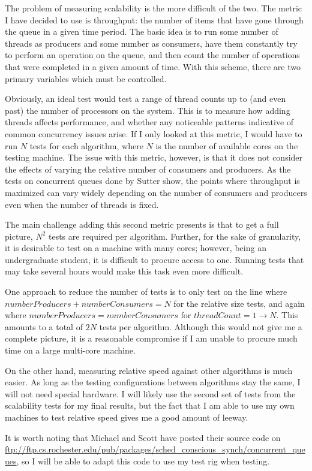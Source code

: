 \documentclass[12pt]{report}
\begin{document}
The problem of measuring scalability is the more difficult of the two. The
metric I have decided to use is throughput: the number of items that have gone
through the queue in a given time period. The basic idea is to run some number
of threads as producers and some number as consumers, have them constantly try
to perform an operation on the queue, and then count the number of operations
that were completed in a given amount of time. With this scheme,
there are two primary variables which must be controlled.

Obviously, an ideal test would test a range of thread counts up to (and even
past) the number of processors on the system. This is to measure how adding
threads affects performance, and whether any noticeable patterns indicative of
common concurrency issues arise. If I only looked at this metric, I would have
to run $N$ tests for each algorithm, where $N$ is the number of available cores
on the testing machine. The issue with this metric, however, is that it does
not consider the effects of varying the relative number of consumers and
producers. As the tests on concurrent queues done by Sutter\cite{suttertest} show,
the points where throughput is maximized can vary widely depending on the
number of consumers and producers even when the number of threads is fixed.

The main challenge adding this second metric presents is that to get a full
picture, $N^2$ tests are required per algorithm. Further, for the sake of
granularity, it is desirable to test on a machine with many cores; however,
being an undergraduate student, it is difficult to procure access to one.
Running tests that may take several hours would make this task even more
difficult.

One approach to reduce the number of tests is to only test on the line where
$numberProducers+numberConsumers=N$ for the relative size tests, and again
where $numberProducers=numberConsumers$ for $threadCount=1\to N$. This amounts
to a total of $2N$ tests per algorithm. Although this would not give me a
complete picture, it is a reasonable compromise if I am unable to procure much
time on a large multi-core machine.

On the other hand, measuring relative speed against other algorithms is much
easier. As long as the testing configurations between algorithms stay the same,
I will not need special hardware. I will likely use the second set of tests
from the scalability tests for my final results, but the fact that I am able to
use my own machines to test relative speed gives me a good amount of leeway.

It is worth noting that Michael and Scott have posted their source code on
\url{ftp://ftp.cs.rochester.edu/pub/packages/sched\_conscious\_synch/concurrent\_queues},
so I will be able to adapt this code to use my test rig when testing.



\end{document}
